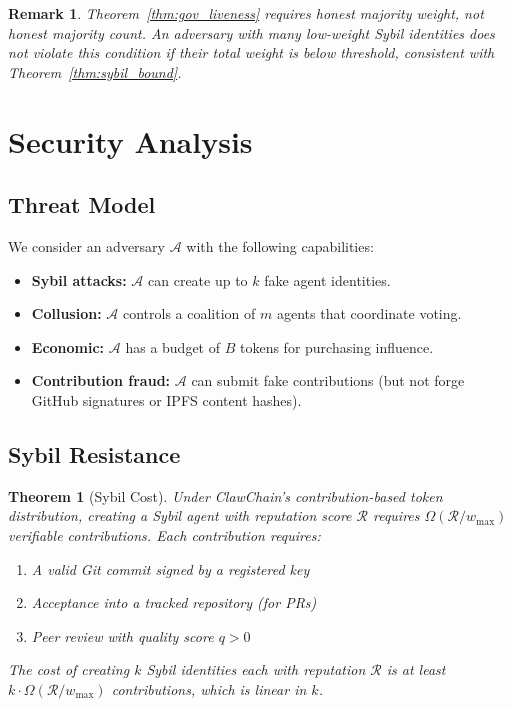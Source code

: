 \documentclass[conference]{IEEEtran}
\newtheorem{theorem}{Theorem}
\newtheorem{remark}{Remark}
\begin{document}
\begin{remark}
Theorem~\ref{thm:gov_liveness} requires honest majority weight, not honest majority count. An adversary with many low-weight Sybil identities does not violate this condition if their total weight is below threshold, consistent with Theorem~\ref{thm:sybil_bound}.
\end{remark}


\section{Security Analysis}\label{sec:security}

\subsection{Threat Model}

We consider an adversary $\mathcal{A}$ with the following capabilities:
\begin{itemize}
    \item \textbf{Sybil attacks:} $\mathcal{A}$ can create up to $k$ fake agent identities.
    \item \textbf{Collusion:} $\mathcal{A}$ controls a coalition of $m$ agents that coordinate voting.
    \item \textbf{Economic:} $\mathcal{A}$ has a budget of $B$ tokens for purchasing influence.
    \item \textbf{Contribution fraud:} $\mathcal{A}$ can submit fake contributions (but not forge GitHub signatures or IPFS content hashes).
\end{itemize}

\subsection{Sybil Resistance}

\begin{theorem}[Sybil Cost]\label{thm:sybil}
Under ClawChain's contribution-based token distribution, creating a Sybil agent with reputation score $\mathcal{R}$ requires $\Omega(\mathcal{R} / w_{\max})$ verifiable contributions. Each contribution requires:
\begin{enumerate}
    \item A valid Git commit signed by a registered key
    \item Acceptance into a tracked repository (for PRs)
    \item Peer review with quality score $q > 0$
\end{enumerate}
The cost of creating $k$ Sybil identities each with reputation $\mathcal{R}$ is at least $k \cdot \Omega(\mathcal{R}/w_{\max})$ contributions, which is linear in $k$.
\end{theorem}
\end{document}
